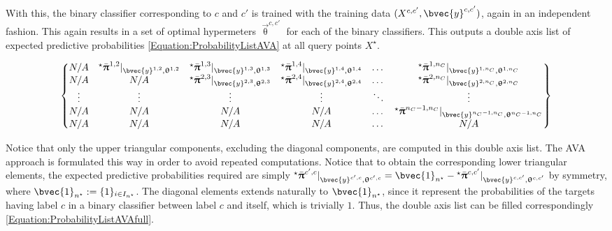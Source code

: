 				With this, the binary classifier corresponding to $c$ and $c'$ is trained with the training data $(X^{c, c'}, \bvec{y}^{c, c'})$, again in an independent fashion. This again results in a set of optimal hypermeters $\vec{\uptheta}^{c, c'}$ for each of the binary classifiers. This outputs a double axis list of expected predictive probabilities \eqref{Equation:ProbabilityListAVA} at all query points $X^{\star}$.
				
				\begin{equation}
					\begin{Bmatrix*}
						N/A & {^{\star}}\bar{\vec{\uppi}}^{1, 2} |_{\bvec{y}^{1, 2}, \vec{\uptheta}^{1, 2}} & {^{\star}}\bar{\vec{\uppi}}^{1, 3} |_{\bvec{y}^{1, 3}, \vec{\uptheta}^{1, 3}} & {^{\star}}\bar{\vec{\uppi}}^{1, 4} |_{\bvec{y}^{1, 4}, \vec{\uptheta}^{1, 4}} & \dots & {^{\star}}\bar{\vec{\uppi}}^{1, n_{C}} |_{\bvec{y}^{1, n_{C}}, \vec{\uptheta}^{1, n_{C}}} \\
						N/A & N/A & {^{\star}}\bar{\vec{\uppi}}^{2, 3} |_{\bvec{y}^{2, 3}, \vec{\uptheta}^{2, 3}} & {^{\star}}\bar{\vec{\uppi}}^{2, 4} |_{\bvec{y}^{2, 4}, \vec{\uptheta}^{2, 4}} & \dots & {^{\star}}\bar{\vec{\uppi}}^{2, n_{C}} |_{\bvec{y}^{2, n_{C}}, \vec{\uptheta}^{2, n_{C}}} \\
						\vdots & \vdots & \vdots & \vdots & \ddots & \vdots \\
						N/A & N/A & N/A & N/A & \dots & {^{\star}}\bar{\vec{\uppi}}^{n_{C} - 1, n_{C}} |_{\bvec{y}^{n_{C} - 1, n_{C}}, \vec{\uptheta}^{n_{C} - 1, n_{C}}} \\
						N/A & N/A & N/A & N/A & \dots & N/A
					\end{Bmatrix*} 
				\label{Equation:ProbabilityListAVA}
				\end{equation}				
							
				Notice that only the upper triangular components, excluding the diagonal components, are computed in this double axis list. The AVA approach is formulated this way in order to avoid repeated computations. Notice that to obtain the corresponding lower triangular elements, the expected predictive probabilities required are simply ${^{\star}}\bar{\vec{\uppi}}^{c', c} |_{\bvec{y}^{c', c}, \vec{\uptheta}^{c', c}} = \bvec{1}_{n^{\star}} - {^{\star}}\bar{\vec{\uppi}}^{c, c'} |_{\bvec{y}^{c, c'}, \vec{\uptheta}^{c, c'}}$ by symmetry, where $\bvec{1}_{n^{\star}} := \{1\}_{i \in I_{n^{\star}}}$. The diagonal elements extends naturally to $\bvec{1}_{n^{\star}}$, since it represent the probabilities of the targets having label $c$ in a binary classifier between label $c$ and itself, which is trivially $1$. Thus, the double axis list can be filled correspondingly \eqref{Equation:ProbabilityListAVAfull}.
				
